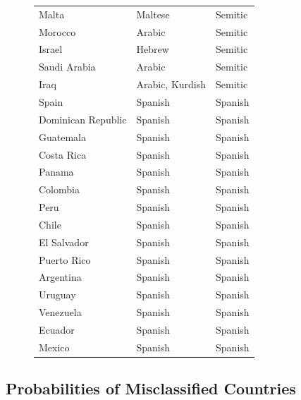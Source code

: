 \documentclass[a4paper,10pt]{article}
\begin{document}
\begin{figure}
\begin{longtable}[]{@{}lll@{}}
Malta & Maltese & Semitic \\
Morocco & Arabic & Semitic \\
Israel & Hebrew & Semitic \\
Saudi Arabia & Arabic & Semitic \\
Iraq & Arabic, Kurdish & Semitic \\
Spain & Spanish & Spanish \\
Dominican Republic & Spanish & Spanish \\
Guatemala & Spanish & Spanish \\
Costa Rica & Spanish & Spanish \\
Panama & Spanish & Spanish \\
Colombia & Spanish & Spanish \\
Peru & Spanish & Spanish \\
Chile & Spanish & Spanish \\
El Salvador & Spanish & Spanish \\
Puerto Rico & Spanish & Spanish \\
Argentina & Spanish & Spanish \\
Uruguay & Spanish & Spanish \\
Venezuela & Spanish & Spanish \\
Ecuador & Spanish & Spanish \\
Mexico & Spanish & Spanish \\
\bottomrule
\end{longtable}
\label{langs1}
\end{figure}

\subsection{Probabilities of Misclassified Countries}
\end{document}
